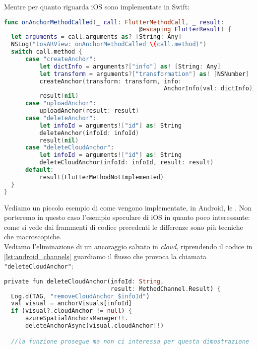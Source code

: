 Mentre per quanto riguarda iOS sono implementate in Swift:

\begin{lstlisting}[language=swift, label={lst:ios_channels}, firstnumber=1,caption={iOS chiamate dei \textit{method channel} per effettuare \textit{create, delete, ulpoad, delete cloud anchor}}]
func onAnchorMethodCalled(_ call: FlutterMethodCall, _ result: 
                                      @escaping FlutterResult) {
  let arguments = call.arguments as? [String: Any]
  NSLog("IosARView: onAnchorMethodCalled \(call.method)")
  switch call.method {
      case "createAnchor":
          let dictInfo = arguments?["info"] as! [String: Any]
          let transform = arguments?["transformation"] as! [NSNumber]
          createAnchor(transform: transform, info: 
                                             AnchorInfo(val: dictInfo))
          result(nil)
      case "uploadAnchor":
          uploadAnchor(result: result)
      case "deleteAnchor":
          let infoId = arguments!["id"] as! String
          deleteAnchor(infoId: infoId)
          result(nil)
      case "deleteCloudAnchor":
          let infoId = arguments!["id"] as! String
          deleteCloudAnchor(infoId: infoId, result: result)
      default:
          result(FlutterMethodNotImplemented)
  }
}
\end{lstlisting}

Vediamo un piccolo esempio di come vengono implementate, in Android, le \asa{}. Non porteremo in questo caso l'esempio speculare di iOS in quanto poco interessante: come si vede dai frammenti di codice precedenti le differenze sono più tecniche che macroscopiche.\\
Vediamo l'eliminazione di un ancoraggio salvato in \textit{cloud}, riprendendo il codice in \ref{lst:android_channels} guardiamo il flusso che provoca la chiamata \verb+"deleteCloudAnchor"+:

\begin{lstlisting}[language=dart, label={lst:asa_android_call}, firstnumber=1,caption={Eliminazione \textit{cloud anchor} lato Android, chiamata}]
private fun deleteCloudAnchor(infoId: String,
                              result: MethodChannel.Result) {
  Log.d(TAG, "removeCloudAnchor $infoId")
  val visual = anchorVisuals[infoId]
  if (visual?.cloudAnchor != null) {
      azureSpatialAnchorsManager!!.
      deleteAnchorAsync(visual.cloudAnchor!!)

  //la funzione prosegue ma non ci interessa per questa dimostrazione
\end{lstlisting}

